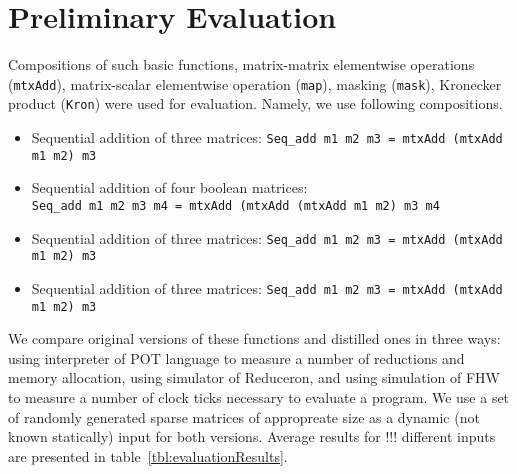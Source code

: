 \section{Preliminary Evaluation}

Compositions of such basic functions, matrix-matrix elementwise operations (\verb|mtxAdd|), matrix-scalar elementwise operation (\verb|map|), masking (\verb|mask|), Kronecker product (\verb|Kron|) were used for evaluation.
Namely, we use following compositions.
\begin{itemize}
     \item Sequential addition of three matrices: \verb|Seq_add m1 m2 m3 = mtxAdd (mtxAdd m1 m2) m3 |  
     \item Sequential addition of four boolean matrices: \\ \verb|Seq_add m1 m2 m3 m4 = mtxAdd (mtxAdd (mtxAdd m1 m2) m3 m4|  
     \item Sequential addition of three matrices: \verb|Seq_add m1 m2 m3 = mtxAdd (mtxAdd m1 m2) m3 |  
     \item Sequential addition of three matrices: \verb|Seq_add m1 m2 m3 = mtxAdd (mtxAdd m1 m2) m3 |  
\end{itemize}
We compare original versions of these functions and distilled ones in three ways: using interpreter of POT language to measure a number of reductions and memory allocation, using simulator of Reduceron, and using simulation of FHW to measure a number of clock ticks necessary to evaluate a program.
We use a set of randomly generated sparse matrices of appropreate size as a dynamic (not known statically) input for both versions.
Average results for !!! different inputs are presented in table~\ref{tbl:evaluationResults}. 

